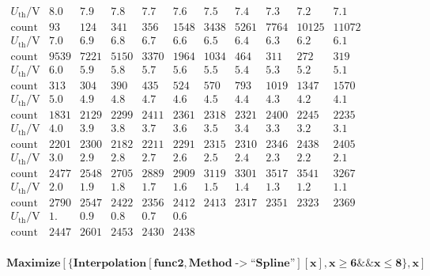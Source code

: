 \documentclass{article}
\begin{document}
\begin{doublespace}
\noindent\(\begin{array}{lllllllllll}
 U_{\text{th}}\text{/V} & 8.0 & 7.9 & 7.8 & 7.7 & 7.6 & 7.5 & 7.4 & 7.3 & 7.2 & 7.1 \\
 \text{count} & 93 & 124 & 341 & 356 & 1548 & 3438 & 5261 & 7764 & 10125 & 11072 \\
 U_{\text{th}}\text{/V} & 7.0 & 6.9 & 6.8 & 6.7 & 6.6 & 6.5 & 6.4 & 6.3 & 6.2 & 6.1 \\
 \text{count} & 9539 & 7221 & 5150 & 3370 & 1964 & 1034 & 464 & 311 & 272 & 319 \\
 U_{\text{th}}\text{/V} & 6.0 & 5.9 & 5.8 & 5.7 & 5.6 & 5.5 & 5.4 & 5.3 & 5.2 & 5.1 \\
 \text{count} & 313 & 304 & 390 & 435 & 524 & 570 & 793 & 1019 & 1347 & 1570 \\
 U_{\text{th}}\text{/V} & 5.0 & 4.9 & 4.8 & 4.7 & 4.6 & 4.5 & 4.4 & 4.3 & 4.2 & 4.1 \\
 \text{count} & 1831 & 2129 & 2299 & 2411 & 2361 & 2318 & 2321 & 2400 & 2245 & 2235 \\
 U_{\text{th}}\text{/V} & 4.0 & 3.9 & 3.8 & 3.7 & 3.6 & 3.5 & 3.4 & 3.3 & 3.2 & 3.1 \\
 \text{count} & 2201 & 2300 & 2182 & 2211 & 2291 & 2315 & 2310 & 2346 & 2438 & 2405 \\
 U_{\text{th}}\text{/V} & 3.0 & 2.9 & 2.8 & 2.7 & 2.6 & 2.5 & 2.4 & 2.3 & 2.2 & 2.1 \\
 \text{count} & 2477 & 2548 & 2705 & 2889 & 2909 & 3119 & 3301 & 3517 & 3541 & 3267 \\
 U_{\text{th}}\text{/V} & 2.0 & 1.9 & 1.8 & 1.7 & 1.6 & 1.5 & 1.4 & 1.3 & 1.2 & 1.1 \\
 \text{count} & 2790 & 2547 & 2422 & 2356 & 2412 & 2413 & 2317 & 2351 & 2323 & 2369 \\
 U_{\text{th}}\text{/V} & 1. & 0.9 & 0.8 & 0.7 & 0.6 & \text{} & \text{} & \text{} & \text{} & \text{} \\
 \text{count} & 2447 & 2601 & 2453 & 2430 & 2438 & \text{} & \text{} & \text{} & \text{} & \text{} \\
\end{array}\)
\end{doublespace}

\begin{doublespace}
\noindent\(\pmb{\text{Maximize}[\{\text{Interpolation}[\text{func2},\text{Method}\text{-$>$}\text{{``}Spline{''}}][x],x\geq 6\&\&x\leq 8\},x]}\)
\end{doublespace}
\end{document}

